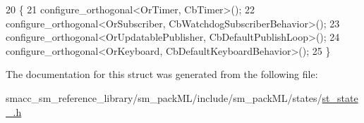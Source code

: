 \begin{DoxyCode}
20     \{
21         configure\_orthogonal<OrTimer, CbTimer>();
22         configure\_orthogonal<OrSubscriber, CbWatchdogSubscriberBehavior>();
23         configure\_orthogonal<OrUpdatablePublisher, CbDefaultPublishLoop>();
24         configure\_orthogonal<OrKeyboard, CbDefaultKeyboardBehavior>();
25     \}
\end{DoxyCode}


The documentation for this struct was generated from the following file\+:\begin{DoxyCompactItemize}
\item 
smacc\+\_\+sm\+\_\+reference\+\_\+library/sm\+\_\+pack\+M\+L/include/sm\+\_\+pack\+M\+L/states/\hyperlink{sm__packML_2include_2sm__packML_2states_2st__state__3_8h}{st\+\_\+state\+\_.\+h}\end{DoxyCompactItemize}
